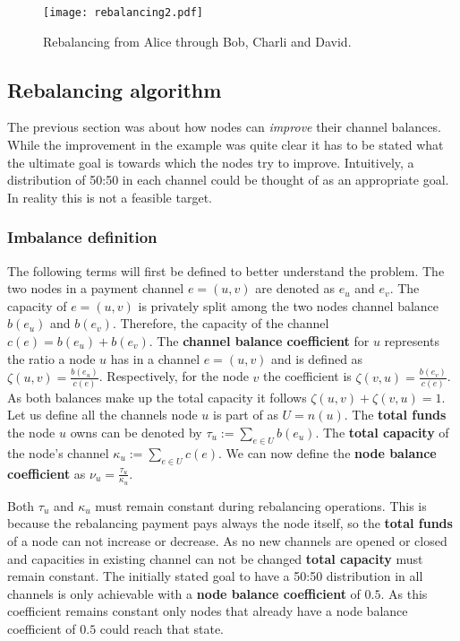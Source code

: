 \documentclass[final]{fhnwreport}       %
\begin{document}
\begin{figure}[H]
\centering
\texttt{[image: rebalancing2.pdf]}
\caption{Rebalancing from Alice through Bob, Charli and David.}
\label{fig:rebal2}
\end{figure}

\subsection{Rebalancing algorithm}
The previous section was about how nodes can \textit{improve} their channel balances. While the improvement in the example was quite clear it has to be stated what the ultimate goal is towards which the nodes try to improve. Intuitively, a distribution of 50:50 in each channel could be thought of as an appropriate goal. In reality this is not a feasible target.

\subsubsection{Imbalance definition}
The following terms will first be defined to better understand the problem. The two nodes in a payment channel $e=(u,v)$ are denoted as $e_u$ and $e_v$. The capacity of $e=(u,v)$ is privately split among the two nodes channel balance $b(e_u)$ and $b(e_v)$. Therefore, the capacity of the channel $c(e)=b(e_u)+b(e_v)$. The \textbf{channel balance coefficient } for $u$ represents the ratio a node $u$ has in a channel $e=(u,v)$ and is defined as $\zeta{(u,v)}=\frac{b(e_u)}{c(e)}$. Respectively, for the node $v$ the coefficient is $\zeta{(v,u)}=\frac{b(e_v)}{c(e)}$. As both balances make up the total capacity it follows  $\zeta{(u,v)} + \zeta{(v,u)}=1$. Let us define all the channels node $u$ is part of as $U=n(u)$. The \textbf{total funds} the node $u$ owns can be denoted by $\tau_u:=\displaystyle{\sum_{e\in U}b(e_u)}$. The \textbf{total capacity} of the node's channel $\kappa_u:=\displaystyle{\sum_{e\in U}c(e)}$. We can now define the \textbf{node balance coefficient} as $\nu_u = \frac{\tau_u}{\kappa_u}$.

Both $\tau_u$ and $\kappa_u$ must remain constant during rebalancing operations. This is because the rebalancing payment pays always the node itself, so the \textbf{total funds} of a node can not increase or decrease. As no new channels are opened or closed and capacities in existing channel can not be changed \textbf{total capacity} must remain constant. The initially stated goal to have a 50:50 distribution in all channels is only achievable with a \textbf{node balance coefficient} of $0.5$. As this coefficient remains constant only nodes that already have a node balance coefficient of $0.5$ could reach that state.
\end{document}
